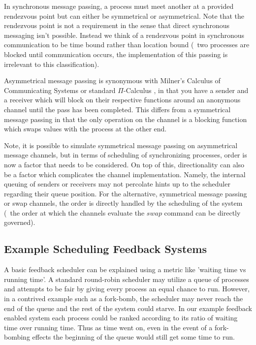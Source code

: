 In synchronous message passing, a process must meet another at a provided rendezvous point but can either be symmetrical
or asymmetrical. Note that the rendezvous point is not a requirement in the sense that direct synchronous messaging isn't 
possible. Instead we think of a rendezvous point in synchronous communication to be time bound rather than location bound (\ie~two
processes are blocked until communication occurs, the implementation of this passing is irrelevant to this 
classification).

Asymmetrical message passing is synonymous with Milner's Calculus of Communicating Systems \cite{milner1982calculus} 
or standard $\Pi$-Calculus \cite{palamidessi1997comparing}, in that you have a sender and a receiver which will 
block on their respective functions around an anonymous channel until the pass has been completed. This differs from a 
symmetrical message passing in that the only operation on the channel is a blocking function which swaps values 
with the process at the other end.

Note, it is possible to simulate symmetrical message passing on asymmetrical message channels, but in terms of scheduling of
synchronizing processes, order is now a factor that needs to be considered. On top of this, directionality can also be a factor
which complicates the channel implementation. Namely, the internal queuing of senders or receivers may not percolate hints up to
the scheduler regarding their queue position. For the alternative, symmetrical message passing or swap channels, the order is
directly handled by the scheduling of the system (\ie~the order at which the channels evaluate the $swap$ command can be 
directly governed).

\subsection{Example Scheduling Feedback Systems}

A basic feedback scheduler can be explained using a metric like 'waiting time vs running time'. A standard round-robin
scheduler may utilize a queue of processes and attempts to be fair by giving every process an equal chance to run.
However, in a contrived example such as a fork-bomb, the scheduler may never reach the end of the queue and the rest of 
the system could starve. In our example feedback enabled system each process could be ranked according to its ratio of 
waiting time over running time. Thus as time went on, even in the event of a fork-bombing effects the beginning of the
queue would still get some time to run.

